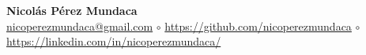 \begin{center}
	\huge \textbf{Nicolás Pérez Mundaca} \\
	\large
	\href{mailto:nicoperezmundaca@gmail.com}{nicoperezmundaca@gmail.com}
	$\circ$
	\url{https://github.com/nicoperezmundaca}
	$\circ$
	\url{https://linkedin.com/in/nicoperezmundaca/}
	\vspace{-0.2em}
\end{center}